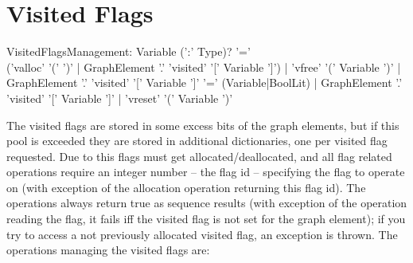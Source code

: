  
\section{Visited Flags}

\begin{rail}
  VisitedFlagsManagement:
    Variable (':' Type)? '=' \\('valloc' '(' ')' | GraphElement '.' 'visited' '[' Variable ']') |
    'vfree' '(' Variable ')' |
    GraphElement '.' 'visited' '[' Variable ']' '=' (Variable|BoolLit) |
    GraphElement '.' 'visited' '[' Variable ']' |
    'vreset' '(' Variable ')'
\end{rail}
The visited flags are stored in some excess bits of the graph elements, but if this pool is exceeded they are stored in additional dictionaries, one per visited flag requested.
Due to this flags must get allocated/deallocated, and all flag related operations require an integer number -- the flag id -- specifying the flag to operate on (with exception of the allocation operation returning this flag id).
The operations always return true as sequence results (with exception of the operation reading the flag, it fails iff the visited flag is not set for the graph element);
if you try to access a not previously allocated visited flag, an exception is thrown.
The operations managing the visited flags are:
